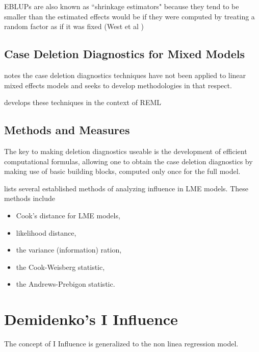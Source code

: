 \documentclass[12pt, a4paper]{article}
\begin{document}
EBLUPs are also known as ``shrinkage estimators" because they tend to be smaller than the estimated effects would be if they were computed by treating a random factor as if it was fixed (West et al )




\newpage



\subsection{Case Deletion Diagnostics for Mixed Models}

\citet{Christiansen} notes the case deletion diagnostics techniques have not been applied to linear mixed effects models and seeks to develop methodologies in that respect.

\citet{Christiansen} develops these techniques in the context of REML

\subsection{Methods and Measures}
The key to making deletion diagnostics useable is the development of efficient computational formulas, allowing one to obtain the  case deletion diagnostics by making use of basic building blocks, computed only once for the full model.

\citet{Zewotir} lists several established methods of analyzing influence in LME models. These methods include \begin{itemize}
	\item Cook's distance for LME models,
	\item {} likelihood distance,
	\item the variance (information) ration,
	\item the  Cook-Weisberg statistic,
	\item the  Andrews-Prebigon statistic.
\end{itemize}




\section{Demidenko's I Influence} %
The concept of I Influence is generalized  to the non linea regression model.
\end{document}
